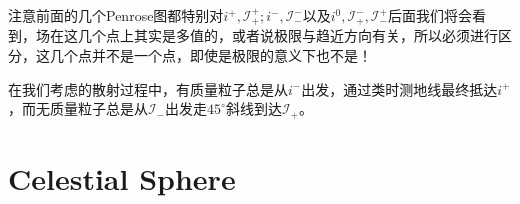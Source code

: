 注意前面的几个Penrose图都特别对$i^+,\mathcal{I}_+^+;i^-,\mathcal{I}_-^-$以及$i^0,\mathcal{I}_+^-,\mathcal{I}_-^+$后面我们将会看到，场在这几个点上其实是多值的，或者说极限与趋近方向有关，所以必须进行区分，这几个点并不是一个点，即使是极限的意义下也不是！

在我们考虑的散射过程中，有质量粒子总是从$i^-$出发，通过类时测地线最终抵达$i^+$，而无质量粒子总是从$\mathcal{I}_-$出发走$45^\circ$斜线到达$\mathcal{I}_+$。


\section{Celestial Sphere}
\begin{figure}[htbp]
	\centering
	
	\begin{tikzpicture}[x=0.75pt,y=0.75pt,yscale=-1,xscale=1]
		

\end{tikzpicture}
\end{figure}

